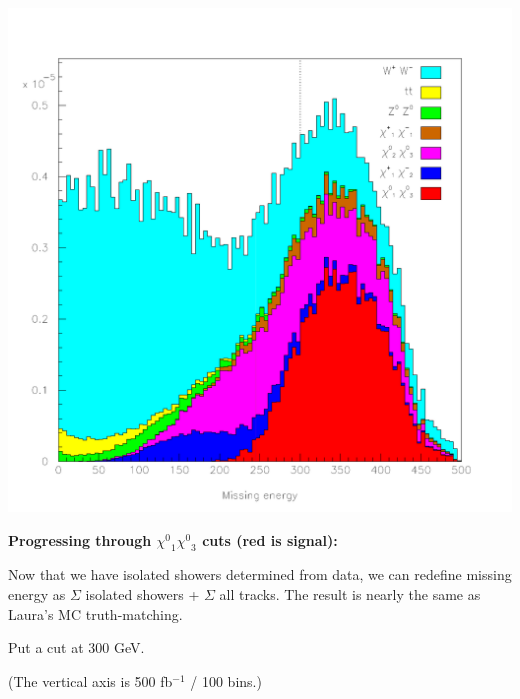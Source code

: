 \documentclass[landscape]{article}
\begin{document}
\begin{center} \includegraphics[height=0.8\textheight]{withmatching_1.pdf} \end{center}

{\Large \bf Progressing through $\mbox{$\chi^0$}_1 \mbox{$\chi^0$}_3$ cuts (red is signal):}

\vspace{0.2 cm}
Now that we have isolated showers determined from data, we can
redefine missing energy as $\Sigma$ isolated showers + $\Sigma$ all
tracks.  The result is nearly the same as Laura's MC truth-matching.

\vspace{0.2 cm}
Put a cut at 300 GeV.

\vspace{0.2 cm}
(The vertical axis is 500 fb$^{-1}$ / 100 bins.)

\pagebreak
\end{document}
